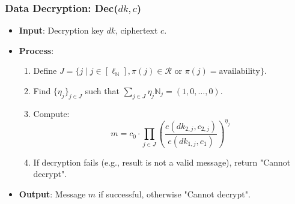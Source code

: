 \documentclass[runningheads]{llncs}
\begin{document}
\subsubsection{Data Decryption: Dec($dk, c$)}
\begin{itemize}
    \item \textbf{Input}: Decryption key $dk$, ciphertext $c$.
    \item \textbf{Process}:
    \begin{enumerate}
        \item Define $J = \{ j \mid j \in [\ell_\mathbb{N}], \pi(j) \in \mathcal{R} \text{ or } \pi(j) = \text{availability} \}$.
        \item Find $\{\eta_j\}_{j \in J}$ such that $\sum_{j \in J} \eta_j \mathbb{N}_j = (1, 0, \ldots, 0)$.
        \item Compute:
        \[
        m = c_0 \cdot \prod_{j \in J} \left( \frac{e(dk_{2,j}, c_{2,j})}{e(dk_{1,j}, c_1)} \right)^{\eta_j}
        \]
        \item If decryption fails (e.g., result is not a valid message), return "Cannot decrypt".
    \end{enumerate}
    \item \textbf{Output}: Message $m$ if successful, otherwise "Cannot decrypt".
\end{itemize}
\end{document}
